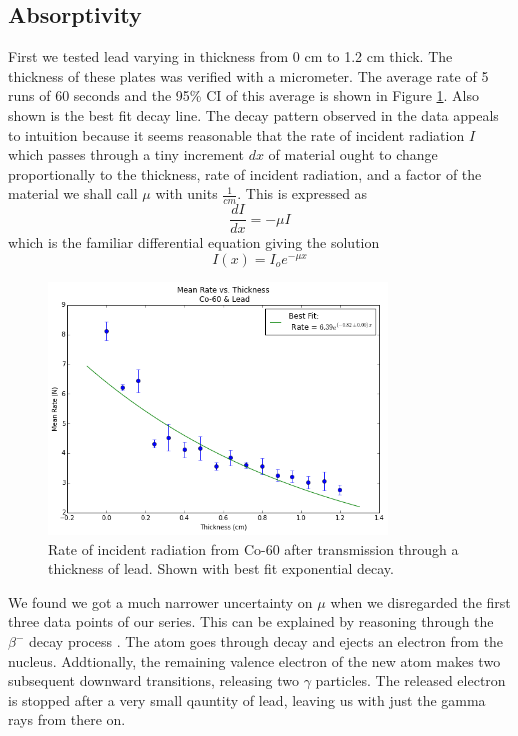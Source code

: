 \documentclass[aps,twocolumn,secnumarabic,balancelastpage,amsmath,amssymb,nofootinbib]{revtex4}
\begin{document}
\subsection{Absorptivity}
First we tested lead varying in thickness from 0 cm to 1.2 cm thick. The thickness of these plates was verified with a micrometer. The average rate of 5 runs of 60 seconds and the 95\% CI of this average is shown in Figure \ref{fig:leadAbsorbRaw}. Also shown is the best fit decay line. The decay pattern observed in the data appeals to intuition because it seems reasonable that the rate of incident radiation $I$ which passes through a tiny increment $dx$ of material ought to change proportionally to the thickness, rate of incident radiation, and a factor of the material we shall call $\mu$ with units $\frac{1}{cm}$. This is expressed as $$\frac{dI}{dx} = -\mu I$$
which is the familiar differential equation giving the solution
\begin{equation}
I(x) = I_oe^{-\mu x}
\label{eqn:incidentAfterX}
\end{equation}

\begin{figure}
\includegraphics[width=9cm]{leadAbsorbRaw}
\caption{Rate of incident radiation from Co-60 after transmission through a thickness of lead. Shown with best fit exponential decay.}
\label{fig:leadAbsorbRaw}
\end{figure}

We found we got a much narrower uncertainty on $\mu$ when we disregarded the first three data points of our series. This can be explained by reasoning through the $\beta ^-$ decay process \cite{Co60}. The atom goes through decay and ejects an electron from the nucleus. Addtionally, the remaining valence electron of the new atom makes two subsequent downward transitions, releasing two $\gamma$ particles. The released electron is stopped after a very small qauntity of lead, leaving us with just the gamma rays from there on.
\end{document}
